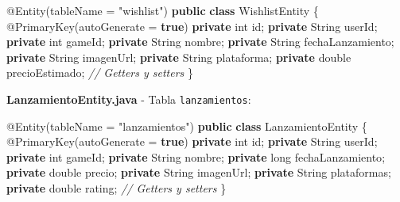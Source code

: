 \documentclass[
  spanish,
  11pt,
  paper=a4,
  ,captions=tableheading
]{scrartcl}
\newenvironment{Shaded}{}{}
\newcommand{\AttributeTok}[1]{\textcolor[rgb]{0.49,0.56,0.16}{#1}}
\newcommand{\BuiltInTok}[1]{\textcolor[rgb]{0.00,0.50,0.00}{#1}}
\newcommand{\CommentTok}[1]{\textcolor[rgb]{0.38,0.63,0.69}{\textit{#1}}}
\newcommand{\DataTypeTok}[1]{\textcolor[rgb]{0.56,0.13,0.00}{#1}}
\newcommand{\KeywordTok}[1]{\textcolor[rgb]{0.00,0.44,0.13}{\textbf{#1}}}
\newcommand{\NormalTok}[1]{#1}
\newcommand{\OperatorTok}[1]{\textcolor[rgb]{0.40,0.40,0.40}{#1}}
\newcommand{\StringTok}[1]{\textcolor[rgb]{0.25,0.44,0.63}{#1}}
\begin{document}
\begin{Shaded}
\begin{Highlighting}[]
\AttributeTok{@Entity}\OperatorTok{(}\NormalTok{tableName }\OperatorTok{=} \StringTok{"wishlist"}\OperatorTok{)}
\KeywordTok{public} \KeywordTok{class}\NormalTok{ WishlistEntity }\OperatorTok{\{}
    \AttributeTok{@PrimaryKey}\OperatorTok{(}\NormalTok{autoGenerate }\OperatorTok{=} \KeywordTok{true}\OperatorTok{)}
    \KeywordTok{private} \DataTypeTok{int}\NormalTok{ id}\OperatorTok{;}
    \KeywordTok{private} \BuiltInTok{String}\NormalTok{ userId}\OperatorTok{;}
    \KeywordTok{private} \DataTypeTok{int}\NormalTok{ gameId}\OperatorTok{;}
    \KeywordTok{private} \BuiltInTok{String}\NormalTok{ nombre}\OperatorTok{;}
    \KeywordTok{private} \BuiltInTok{String}\NormalTok{ fechaLanzamiento}\OperatorTok{;}
    \KeywordTok{private} \BuiltInTok{String}\NormalTok{ imagenUrl}\OperatorTok{;}
    \KeywordTok{private} \BuiltInTok{String}\NormalTok{ plataforma}\OperatorTok{;}
    \KeywordTok{private} \DataTypeTok{double}\NormalTok{ precioEstimado}\OperatorTok{;}
    \CommentTok{// Getters y setters}
\OperatorTok{\}}
\end{Highlighting}
\end{Shaded}

\textbf{LanzamientoEntity.java} - Tabla \texttt{lanzamientos}:

\begin{Shaded}
\begin{Highlighting}[]
\AttributeTok{@Entity}\OperatorTok{(}\NormalTok{tableName }\OperatorTok{=} \StringTok{"lanzamientos"}\OperatorTok{)}
\KeywordTok{public} \KeywordTok{class}\NormalTok{ LanzamientoEntity }\OperatorTok{\{}
    \AttributeTok{@PrimaryKey}\OperatorTok{(}\NormalTok{autoGenerate }\OperatorTok{=} \KeywordTok{true}\OperatorTok{)}
    \KeywordTok{private} \DataTypeTok{int}\NormalTok{ id}\OperatorTok{;}
    \KeywordTok{private} \BuiltInTok{String}\NormalTok{ userId}\OperatorTok{;}
    \KeywordTok{private} \DataTypeTok{int}\NormalTok{ gameId}\OperatorTok{;}
    \KeywordTok{private} \BuiltInTok{String}\NormalTok{ nombre}\OperatorTok{;}
    \KeywordTok{private} \DataTypeTok{long}\NormalTok{ fechaLanzamiento}\OperatorTok{;}
    \KeywordTok{private} \DataTypeTok{double}\NormalTok{ precio}\OperatorTok{;}
    \KeywordTok{private} \BuiltInTok{String}\NormalTok{ imagenUrl}\OperatorTok{;}
    \KeywordTok{private} \BuiltInTok{String}\NormalTok{ plataformas}\OperatorTok{;}
    \KeywordTok{private} \DataTypeTok{double}\NormalTok{ rating}\OperatorTok{;}
    \CommentTok{// Getters y setters}
\OperatorTok{\}}
\end{Highlighting}
\end{Shaded}
\end{document}
